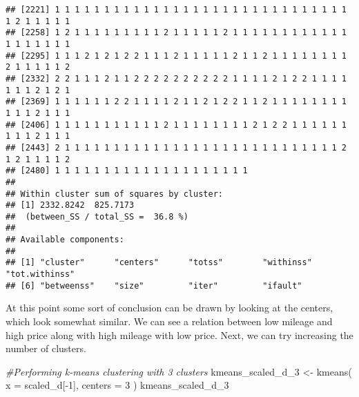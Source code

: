 \documentclass[
]{article}
\newenvironment{Shaded}{\begin{snugshade}}{\end{snugshade}}
\newcommand{\AttributeTok}[1]{\textcolor[rgb]{0.77,0.63,0.00}{#1}}
\newcommand{\CommentTok}[1]{\textcolor[rgb]{0.56,0.35,0.01}{\textit{#1}}}
\newcommand{\DecValTok}[1]{\textcolor[rgb]{0.00,0.00,0.81}{#1}}
\newcommand{\FunctionTok}[1]{\textcolor[rgb]{0.00,0.00,0.00}{#1}}
\newcommand{\NormalTok}[1]{#1}
\newcommand{\OtherTok}[1]{\textcolor[rgb]{0.56,0.35,0.01}{#1}}
\newcommand{\SpecialCharTok}[1]{\textcolor[rgb]{0.00,0.00,0.00}{#1}}
\begin{document}
\begin{verbatim}
## [2221] 1 1 1 1 1 1 1 1 1 1 1 1 1 1 1 1 1 1 1 1 1 1 1 1 1 1 1 1 1 1 1 2 1 1 1 1 1
## [2258] 1 2 1 1 1 1 1 1 1 1 1 2 1 1 1 1 1 2 1 1 1 1 1 1 1 1 1 1 1 1 1 1 1 1 1 1 1
## [2295] 1 1 1 2 1 2 1 2 2 1 1 1 2 1 1 1 1 1 2 1 1 2 1 1 1 1 1 1 1 1 2 1 1 1 1 1 2
## [2332] 2 2 1 1 1 2 1 1 2 2 2 2 2 2 2 2 2 2 1 1 1 1 2 1 2 2 1 1 1 1 1 1 1 2 1 2 1
## [2369] 1 1 1 1 1 1 2 2 1 1 1 1 2 1 1 2 1 2 2 1 1 2 1 1 1 1 1 1 1 1 1 1 1 2 1 1 1
## [2406] 1 1 1 1 1 1 1 1 1 1 1 2 1 1 1 1 1 1 1 1 2 1 2 2 1 1 1 1 1 1 1 1 1 2 1 1 1
## [2443] 2 1 1 1 1 1 1 1 1 1 1 1 1 1 1 1 1 1 1 1 1 1 1 1 1 1 1 1 1 2 1 2 1 1 1 1 2
## [2480] 1 1 1 1 1 1 1 1 1 1 1 1 1 1 1 1 1 1 1 1
## 
## Within cluster sum of squares by cluster:
## [1] 2332.8242  825.7173
##  (between_SS / total_SS =  36.8 %)
## 
## Available components:
## 
## [1] "cluster"      "centers"      "totss"        "withinss"     "tot.withinss"
## [6] "betweenss"    "size"         "iter"         "ifault"
\end{verbatim}

At this point some sort of conclusion can be drawn by looking at the
centers, which look somewhat similar. We can see a relation between low
mileage and high price along with high mileage with low price. Next, we
can try increasing the number of clusters.

\begin{Shaded}
\begin{Highlighting}[]
\CommentTok{\#Performing k{-}means clustering with 3 clusters}
\NormalTok{kmeans\_scaled\_d\_3 }\OtherTok{\textless{}{-}} \FunctionTok{kmeans}\NormalTok{(}
  \AttributeTok{x =}\NormalTok{ scaled\_d[}\SpecialCharTok{{-}}\DecValTok{1}\NormalTok{],}
  \AttributeTok{centers =} \DecValTok{3}
\NormalTok{)}
\NormalTok{kmeans\_scaled\_d\_3}
\end{Highlighting}
\end{Shaded}
\end{document}
